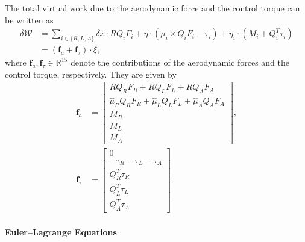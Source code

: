 \documentclass[conf]{new-aiaa}
\renewcommand{\Re}{\ensuremath{\mathbb{R}}}
\begin{document}
The total virtual work due to the aerodynamic force and the control torque can be written as
\begin{align}
    \delta\mathcal{W} & = \sum_{i\in\{R,L,A\}} \delta x \cdot R Q_i F_i + \eta\cdot (\mu_i\times Q_i F_i -\tau_i) + \eta_i \cdot ( M_i+ Q_i^T \tau_i) \nonumber \\
                      & = (\mathbf{f}_{a} + \mathbf{f}_\tau)  \cdot \xi,
\end{align}
where $\mathbf{f}_a, \mathbf{f}_\tau \in\Re^{15}$ denote the contributions of the aerodynamic forces and the control torque, respectively. 
They are given by
\begin{align}
    \mathbf{f}_a & = 
    \begin{bmatrix}
        RQ_R F_R  + R Q_L F_L + R Q_A F_A \\
        \hat \mu_R Q_RF_R + \hat\mu_L Q_L F_L + \hat\mu_A Q_A F_A \\
        M_R  \\
        M_L  \\
        M_A   
    \end{bmatrix},\\
    \mathbf{f}_\tau & = 
    \begin{bmatrix}
        0 \\
         -\tau_R  -\tau_L  -\tau_A \\
        Q_R^T \tau_R \\
        Q_L^T \tau_L \\
        Q_A^T \tau_A
    \end{bmatrix}.\label{eqn:f_tau}
\end{align}

\paragraph{Euler--Lagrange Equations}
\end{document}
